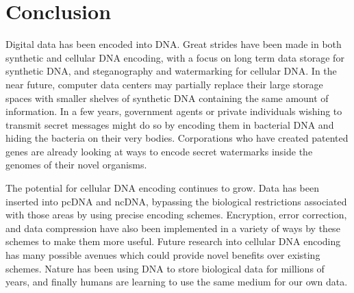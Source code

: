 \documentclass{bioinfo}
\begin{document}
\section{Conclusion}

Digital data has been encoded into DNA. Great strides have been made in both synthetic and cellular DNA encoding, with a focus on long term data storage for synthetic DNA, and steganography and watermarking for cellular DNA. In the near future, computer data centers may partially replace their large storage spaces with smaller shelves of synthetic DNA containing the same amount of information. In a few years, government agents or private individuals wishing to transmit secret messages might do so by encoding them in bacterial DNA and hiding the bacteria on their very bodies. Corporations who have created patented genes are already looking at ways to encode secret watermarks inside the genomes of their novel organisms.

The potential for cellular DNA encoding continues to grow. Data has been inserted into pcDNA and ncDNA, bypassing the biological restrictions associated with those areas by using precise encoding schemes. Encryption, error correction, and data compression have also been implemented in a variety of ways by these schemes to make them more useful. Future research into cellular DNA encoding has many possible avenues which could provide novel benefits over existing schemes. Nature has been using DNA to store biological data for millions of years, and finally humans are learning to use the same medium for our own data. 

%
%
%

%




\end{document}
